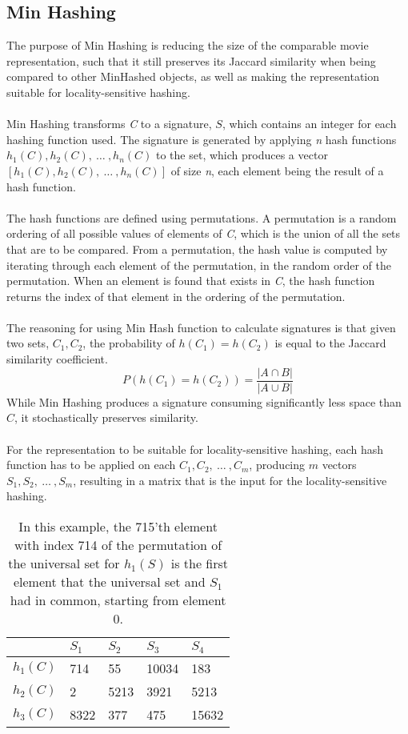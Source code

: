 \subsection{Min Hashing}
The purpose of Min Hashing is reducing the size of the comparable movie representation, such that it still preserves its Jaccard similarity when being compared to other MinHashed objects, as well as making the representation suitable for locality-sensitive hashing.\\ \\
Min Hashing transforms \textit{C} to a signature, \(S\), which contains an integer for each hashing function used. The signature is generated by applying \textit{n} hash functions \(h_1(C), h_2(C),\ \dots\ , h_n(C)\) to the set, which produces a vector \([h_1(C), h_2(C),\ \dots\ , h_n(C)]\) of size \textit{n}, each element being the result of a hash function.\\ \\
The hash functions are defined using permutations. A permutation is a random ordering of all possible values of elements of \textit{C}, which is the union of all the sets that are to be compared. From a permutation, the hash value is computed by iterating through each element of the permutation, in the random order of the permutation. When an element is found that exists in \textit{C}, the hash function returns the index of that element in the ordering of the permutation.\\ \\
The reasoning for using Min Hash function to calculate signatures is that given two sets, \(C_1, C_2\), the probability of \(h(C_1) = h(C_2)\) is equal to the Jaccard similarity coefficient.
\begin{equation}
P(h(C_1) = h(C_2)) = \frac{|A \cap B|}{|A \cup B|}
\end{equation}
While Min Hashing produces a signature consuming significantly less space than \(C\), it stochastically preserves similarity.\\ \\
For the representation to be suitable for locality-sensitive hashing, each hash function has to be applied on each \(C_1, C_2,\ \dots\ , C_m\), producing \(m\) vectors \(S_1, S_2,\ \dots\ , S_m\), resulting in a matrix that is the input for the locality-sensitive hashing.

\begin{table}[h]
\begin{tabular}{l||l|l|l|l}
& \(S_1\) & \(S_2\) & \(S_3\) & \(S_4\) \\ \hline \hline
\(h_1(C)\) & 714 & 55 & 10034 & 183 \\ \hline
\(h_2(C)\) & 2 & 5213 & 3921 & 5213 \\ \hline
\(h_3(C)\) & 8322 & 377 & 475 & 15632
\end{tabular}
\centering
\caption{In this example, the 715'th element with index 714 of the permutation of the universal set for \(h_1(S)\) is the first element that the universal set and \(S_1\) had in common, starting from element 0.}
\end{table}

